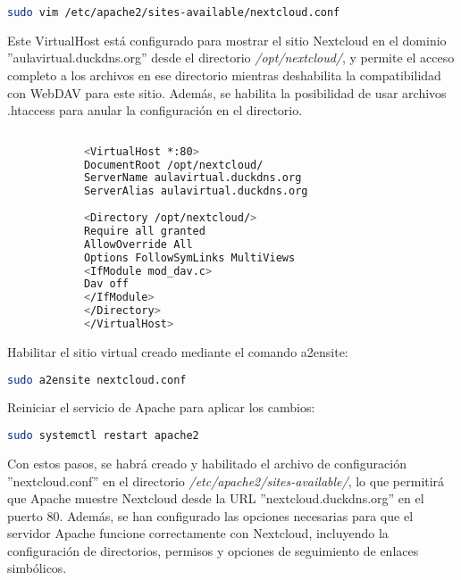 \begin{enumerate}
			\begin{lstlisting}[language=Bash,caption=Directorio de trabajo NextCloud]
			sudo vim /etc/apache2/sites-available/nextcloud.conf
			\end{lstlisting}
		
		Este VirtualHost está configurado para mostrar el sitio Nextcloud en el dominio ''aulavirtual.duckdns.org'' desde el directorio \textit{/opt/nextcloud/}, y permite el acceso completo a los archivos en ese directorio mientras deshabilita la compatibilidad con WebDAV para este sitio. Además, se habilita la posibilidad de usar archivos .htaccess para anular la configuración en el directorio.\par
			
			\begin{lstlisting}[language=Bash,caption=Directorio de trabajo NextCloud]
			
			<VirtualHost *:80>
			DocumentRoot /opt/nextcloud/
			ServerName aulavirtual.duckdns.org
			ServerAlias aulavirtual.duckdns.org
			
			<Directory /opt/nextcloud/>
			Require all granted
			AllowOverride All
			Options FollowSymLinks MultiViews
			<IfModule mod_dav.c>
			Dav off
			</IfModule>
			</Directory>
			</VirtualHost>
			\end{lstlisting}
		
	
			
			Habilitar el sitio virtual creado mediante el comando a2ensite:
			
		    \begin{lstlisting}[language=Bash,caption=Directorio de trabajo NextCloud]
			sudo a2ensite nextcloud.conf
			\end{lstlisting}
			
			Reiniciar el servicio de Apache para aplicar los cambios:
			
			\begin{lstlisting}[language=Bash,caption=Directorio de trabajo NextCloud]
			sudo systemctl restart apache2
			\end{lstlisting}
			
			Con estos pasos, se habrá creado y habilitado el archivo de configuración ''nextcloud.conf'' en el directorio \textit{/etc/apache2/sites-available/}, lo que permitirá que Apache muestre Nextcloud desde la URL ''nextcloud.duckdns.org'' en el puerto 80. Además, se han configurado las opciones necesarias para que el servidor Apache funcione correctamente con Nextcloud, incluyendo la configuración de directorios, permisos y opciones de seguimiento de enlaces simbólicos.


\end{enumerate}
